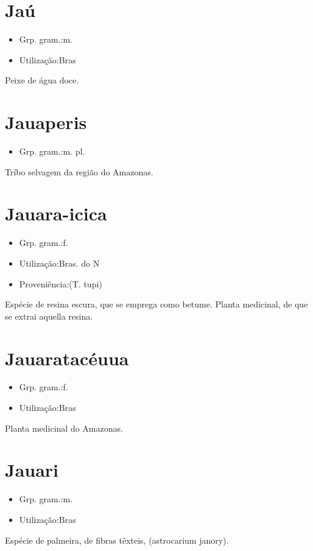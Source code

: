 \documentclass{article}
\begin{document}
\section{Jaú}
\begin{itemize}
\item {Grp. gram.:m.}
\end{itemize}
\begin{itemize}
\item {Utilização:Bras}
\end{itemize}
Peixe de água doce.
\section{Jauaperis}
\begin{itemize}
\item {Grp. gram.:m. pl.}
\end{itemize}
Tríbo selvagem da região do Amazonas.
\section{Jauara-icica}
\begin{itemize}
\item {Grp. gram.:f.}
\end{itemize}
\begin{itemize}
\item {Utilização:Bras. do N}
\end{itemize}
\begin{itemize}
\item {Proveniência:(T. tupi)}
\end{itemize}
Espécie de resina escura, que se emprega como betume.
Planta medicinal, de que se extrai aquella resina.
\section{Jauaratacéuua}
\begin{itemize}
\item {Grp. gram.:f.}
\end{itemize}
\begin{itemize}
\item {Utilização:Bras}
\end{itemize}
Planta medicinal do Amazonas.
\section{Jauari}
\begin{itemize}
\item {Grp. gram.:m.}
\end{itemize}
\begin{itemize}
\item {Utilização:Bras}
\end{itemize}
Espécie de palmeira, de fibras têxteis, (\textunderscore astrocarium janory\textunderscore ).
\end{document}
